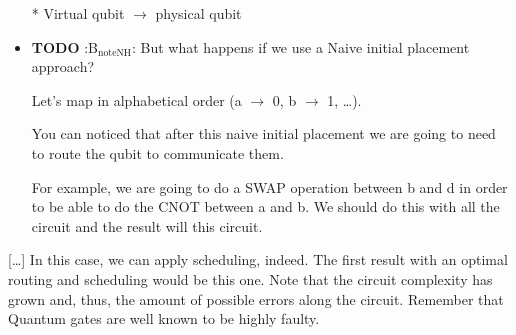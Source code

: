 \begin{itemize}
\tiny{* Virtual qubit $\to$ physical qubit}




\item {\bfseries\sffamily TODO} :B\(_{\text{noteNH}}\):
\label{sec:org10ff2c9}
But what happens if we use a Naive initial placement approach?

Let's map in alphabetical order (a \(\to\) 0, b \(\to\) 1, \ldots{}).

You can noticed that after this naive initial placement we are going to need to route the qubit to communicate them.

For example, we are going to do a SWAP operation between b and d in order to be able to do the CNOT between a and b.
We should do this with all the circuit and the result will this circuit.
\end{itemize}


[\ldots{}]
In this case, we can apply scheduling, indeed. The first result with an optimal routing and scheduling would be this one.
Note that the circuit complexity has grown and, thus, the amount of possible errors along the circuit.
Remember that Quantum gates are well known to be highly faulty.

